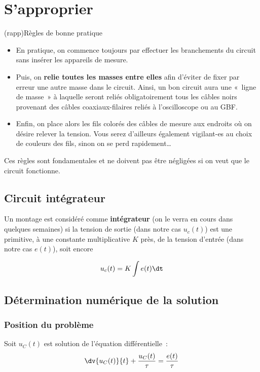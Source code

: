 \documentclass[../main/main.tex]{subfiles}
\begin{document}
{	\section{S'approprier}

	\begin{tcb}(rapp){Règles de bonne pratique}
		\begin{itemize}
			\item En pratique, on commence toujours par effectuer les branchements du
			      circuit sans insérer les appareils de mesure.
			\item Puis, on \textbf{relie toutes les masses entre elles} afin d'éviter
			      de fixer par erreur une autre masse dans le circuit. Ainsi, un bon
			      circuit aura une «~ligne de masse~» à laquelle seront reliés
			      obligatoirement tous les câbles noirs provenant des câbles
			      coaxiaux-filaires reliés à l'oscilloscope ou au GBF.
			\item Enfin, on place alors les fils colorés des câbles de mesure aux
			      endroits où on désire relever la tension. Vous serez d'ailleurs
			      également vigilant-es au choix de couleurs des fils, sinon on se perd
			      rapidement…
		\end{itemize}
		Ces règles sont fondamentales et ne doivent pas être négligées si
		on veut que le circuit fonctionne.
	\end{tcb}

	\subsection{Circuit intégrateur}

	Un montage est considéré comme \textbf{intégrateur} (on le verra en cours dans
	quelques semaines) si la tension de sortie (dans notre cas $u_{c}(t)$) est une
	primitive, à une constante multiplicative $K$ près, de la tension d'entrée
	(dans notre cas $e(t)$), soit encore

	\[u_{c}(t) = K \int e(t) \dt\]

	\subsection{Détermination numérique de la solution}
	\subsubsection{Position du problème}

	Soit $u_{C}(t)$ est solution de l'équation différentielle~:
	\[
		\dv{u_C(t)}{t} + \frac{u_C(t)}{\tau} = \frac{e(t)}{\tau}
	\]

}
\end{document}
